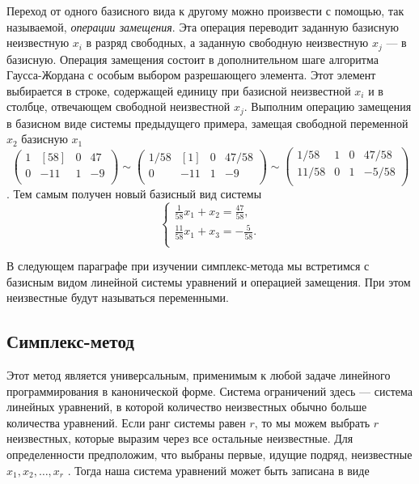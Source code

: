 \documentclass{article}
\begin{document}
Переход от одного базисного вида к другому можно произвести с помощью, так называемой, \textit{операции замещения}. Эта операция переводит заданную базисную неизвестную $x_i$ в разряд свободных, а заданную свободную неизвестную $x_j$ — в базисную. Операция замещения состоит в дополнительном шаге алгоритма Гаусса-Жордана с особым выбором разрешающего элемента. Этот элемент выбирается в строке, содержащей единицу при базисной неизвестной $x_i$ и в столбце, отвечающем свободной неизвестной $x_j$. Выполним операцию замещения в базисном виде системы предыдущего примера, замещая свободной переменной  $x_2$ базисную $x_1$
$$\left(\begin{array}{rrr|r} 
1&[58]\!&0&47\\
0&-11&1&-9\\
\end{array}\right) 
\sim \left(\begin{array}{rrr|r} 
1/58&[1]\!&0&47/58\\
0&-11&1&-9\\
\end{array}\right)
\sim \left(\begin{array}{rrr|r} 
1/58&1&0&47/58\\
11/58&0&1&-5/58\\
\end{array}\right)$$.
Тем самым получен новый базисный вид системы
\begin{equation*}
\begin{cases}
\frac{1}{58}x_1+  x_2 = \frac{47}{58},\\
\frac{11}{58}x_1+ x_3 = -\frac{5}{58}.\\
\end{cases}
\end{equation*}

В следующем параграфе при изучении симплекс-метода мы встретимся с базисным видом линейной системы уравнений и операцией замещения. При этом неизвестные будут называться переменными.



\subsection{Симплекс-метод}
Этот метод является универсальным, применимым к любой задаче линейного программирования в канонической форме. Система ограничений здесь — система линейных уравнений, в которой количество неизвестных обычно  больше  количества  уравнений. Если  ранг  системы равен $r$, то мы можем выбрать $r$ неизвестных, которые выразим через все остальные неизвестные. Для определенности предположим, что выбраны  первые, идущие подряд, неизвестные $x_1,x_2,\dots,x_r$ . Тогда наша система уравнений может быть записана в виде
\end{document}
